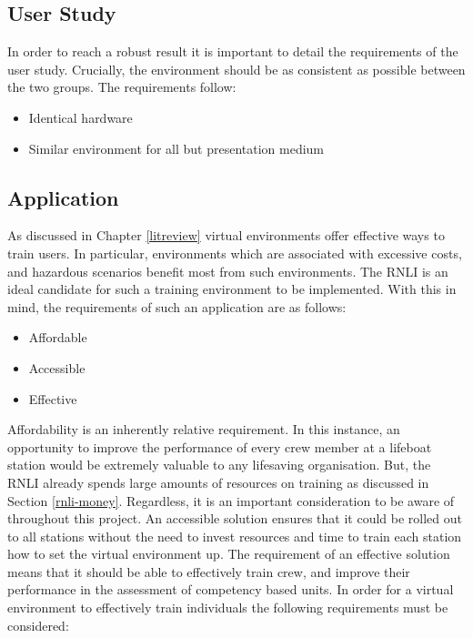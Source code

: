 \documentclass[ %
                    author={Elis Jones},
                supervisor={Dr. Kirsten Cater},
                    degree={BSc},
                     title={The Effect of Presentation Medium on Spatial Cognition},
                  subtitle={in the Virtual Environment},
                      year={2018} ]{dissertation}
\begin{document}
\subsection{User Study}
In order to reach a robust result it is important to detail the requirements of the user study. Crucially, the environment should be as consistent as possible between the two groups. The requirements follow:

\begin{itemize}
    \item Identical hardware
    \item Similar environment for all but presentation medium
\end{itemize}

\subsection{Application}
As discussed in Chapter \ref{litreview} virtual environments offer effective ways to train users. In particular, environments which are associated with excessive costs, and hazardous scenarios benefit most from such environments. The RNLI is an ideal candidate for such a training environment to be implemented. With this in mind, the requirements of such an application are as follows:

\begin{itemize}
    \item Affordable
    \item Accessible
    \item Effective
\end{itemize}

Affordability is an inherently relative requirement. In this instance, an opportunity to improve the performance of every crew member at a lifeboat station would be extremely valuable to any lifesaving organisation. But, the RNLI already spends large amounts of resources on training as discussed in Section \ref{rnli-money}. Regardless, it is an important consideration to be aware of throughout this project. An accessible solution ensures that it could be rolled out to all stations without the need to invest resources and time to train each station how to set the virtual environment up. The requirement of an effective solution means that it should be able to effectively train crew, and improve their performance in the assessment of competency based units. In order for a virtual environment to effectively train individuals the following requirements must be considered:
\end{document}
